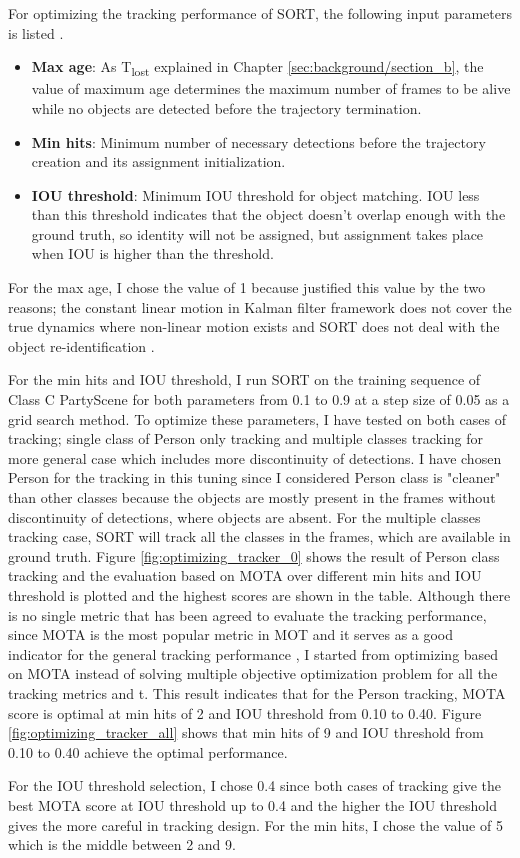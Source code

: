 For optimizing the tracking performance of SORT, the following input parameters is listed \cite{bewley_simple_2016}.
\begin{itemize}
    \item \textbf{Max age}: As T\textsubscript{lost} explained in Chapter \ref{sec:background/section_b}, the value of maximum age determines the maximum number of frames to be alive while no objects are detected before the trajectory termination.
    \item \textbf{Min hits}: Minimum number of necessary detections before the trajectory creation and its assignment initialization.
    \item \textbf{IOU threshold}: Minimum IOU threshold for object matching. IOU less than this threshold indicates that the object doesn't overlap enough with the ground truth, so identity will not be assigned, but assignment takes place when IOU is higher than the threshold.
\end{itemize}
For the max age, I chose the value of 1 because \citeauthor{bewley_simple_2016} justified this value by the two reasons; the constant linear motion in Kalman filter framework does not cover the true dynamics where non-linear motion exists and SORT does not deal with the object re-identification \cite{bewley_simple_2016}. 

For the min hits and IOU threshold, I run SORT on the training sequence of Class C PartyScene for both parameters from 0.1 to 0.9 at a step size of 0.05 as a grid search method. To optimize these parameters, I have tested on both cases of tracking; single class of Person only tracking and multiple classes tracking for more general case which includes more discontinuity of detections. I have chosen Person for the tracking in this tuning since I considered Person class is "cleaner" than other classes because the objects are mostly present in the frames without discontinuity of detections, where objects are absent. For the multiple classes tracking case, SORT will track all the classes in the frames, which are available in ground truth. Figure \ref{fig:optimizing_tracker_0} shows the result of Person class tracking and the evaluation based on MOTA over different min hits and IOU threshold is plotted and the highest scores are shown in the table. Although there is no single metric that has been agreed to evaluate the tracking performance, since MOTA is the most popular metric in MOT and it serves as a good indicator for the general tracking performance \cite{bernardin_evaluating_2008} \cite{milan_mot16_2016}, I started from optimizing based on MOTA instead of solving multiple objective optimization problem for all the tracking metrics and t. This result indicates that for the Person tracking, MOTA score is optimal at min hits of 2 and IOU threshold from 0.10 to 0.40. Figure \ref{fig:optimizing_tracker_all} shows that min hits of 9 and IOU threshold from 0.10 to 0.40 achieve the optimal performance.

For the IOU threshold selection, I chose 0.4 since both cases of tracking give the best MOTA score at IOU threshold up to 0.4 and the higher the IOU threshold gives the more careful in tracking design. For the min hits, I chose the value of 5 which is the middle between 2 and 9. 

